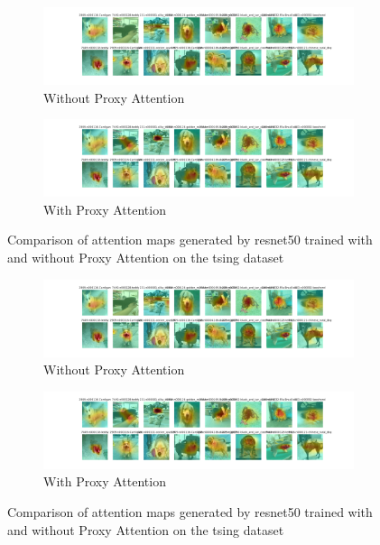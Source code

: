 
    \begin{figure}[H]
        \centering
        \begin{subfigure}[b]{1\textwidth}
            \includegraphics[width=\textwidth]{images/gpp_tsing_resnet50_noproxy_0.pdf}
            \caption{Without Proxy Attention}
        \end{subfigure}
        \hfill
        \begin{subfigure}[b]{1\textwidth}
            \includegraphics[width=\textwidth]{images/gpp_tsing_resnet50_proxy_0.pdf}
            \caption{With Proxy Attention}
        \end{subfigure}
        \caption{Comparison of attention maps generated by resnet50 trained with and without Proxy Attention on the tsing dataset}
    \end{figure}
    

    \begin{figure}[H]
        \centering
        \begin{subfigure}[b]{1\textwidth}
            \includegraphics[width=\textwidth]{images/gpp_tsing_resnet50_noproxy_0.pdf}
            \caption{Without Proxy Attention}
        \end{subfigure}
        \hfill
        \begin{subfigure}[b]{1\textwidth}
            \includegraphics[width=\textwidth]{images/gpp_tsing_resnet50_proxy_0.pdf}
            \caption{With Proxy Attention}
        \end{subfigure}
        \caption{Comparison of attention maps generated by resnet50 trained with and without Proxy Attention on the tsing dataset}
    \end{figure}
    

